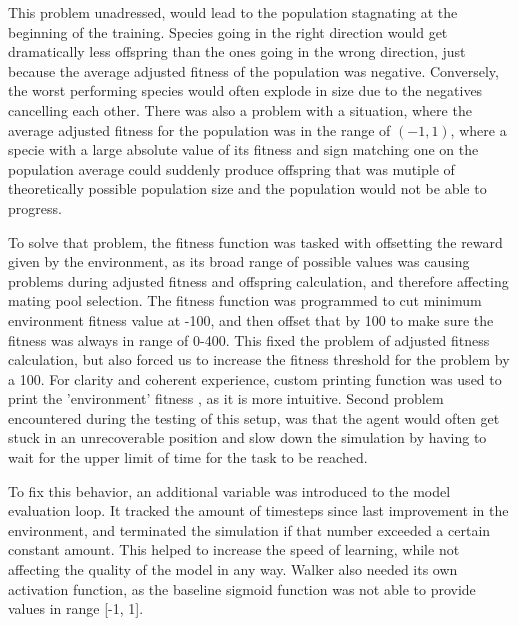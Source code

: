 \documentclass{article}
\begin{document}
\begin{itemize}
\begin{table}[H]
{\begin{tabular}{|l|l|l|l|l|}
    \end{tabular}%
    }
    \end{table}
            This problem unadressed, would lead to the population stagnating at the beginning of the training. Species going in the right direction would
            get dramatically less offspring than the ones going in the wrong direction, just because the average adjusted fitness of the population was negative.
            Conversely, the worst performing species would often explode in size due to the negatives cancelling each other.
            There was also a problem with a situation, where the average adjusted fitness for the population was in the range of $(-1,1)$, where a 
            specie with a large absolute value of its fitness and sign matching one on the population average could suddenly produce offspring
            that was mutiple of theoretically possible population size
            and the population would not be able to progress.   
            \par To solve that problem, the fitness function 
            was tasked with offsetting the reward given by the environment, as its broad range of possible values was causing
            problems during adjusted fitness and offspring calculation, and therefore affecting mating pool selection. The fitness function was 
            programmed to cut minimum environment fitness value at -100, and then offset that by 100 to make sure the fitness was always in range
            of 0-400. This fixed the problem of adjusted fitness calculation, but also forced us to increase the fitness threshold 
            for the problem by a 100. For clarity and coherent experience, custom printing function was used to print the 'environment' fitness
            , as it is more intuitive. 
            Second problem encountered during the testing of this setup, was that 
            the agent would often get stuck in an unrecoverable position and slow down the simulation by having to wait for the upper limit of time
            for the task to be reached.\par To fix this behavior, an additional variable was introduced to the model evaluation loop. It
            tracked the amount of timesteps since last improvement in the environment, and terminated the simulation if that number exceeded 
            a certain constant amount. This helped to increase the speed of learning, while not affecting the quality of the model in any way.
            Walker also needed its own activation function, as the baseline sigmoid function was not able to provide values in range [-1, 1].
            \end{itemize}
\end{document}
